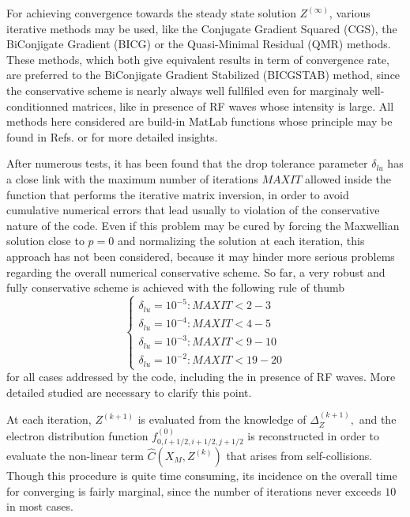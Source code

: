 For achieving convergence towards the steady state solution $Z^{(\infty )}$,
various iterative methods may be used, like the Conjugate Gradient Squared
(CGS), the BiConjigate Gradient (BICG) or the Quasi-Minimal Residual (QMR)
methods. These methods, which both give equivalent results in term of
convergence rate, are preferred to the BiConjigate Gradient Stabilized
(BICGSTAB) method, since the conservative scheme is nearly always well
fullfiled even for marginaly well-conditionned matrices, like in presence of
RF waves whose intensity is large. All methods here considered are build-in
MatLab functions whose principle may be found in Refs. \cite{pre92} or \cite
{axe94} for more detailed insights.

After numerous tests, it has been found that the drop tolerance parameter $%
\delta _{lu}$ has a close link with the maximum number of iterations $MAXIT$
allowed inside the function that performs the iterative matrix inversion, in
order to avoid cumulative numerical errors that lead usually to violation of
the conservative nature of the code. Even if this problem may be cured by
forcing the Maxwellian solution close to $p=0$ and normalizing the solution
at each iteration, this approach has not been considered, because it may
hinder more serious problems regarding the overall numerical conservative
scheme. So far, a very robust and fully conservative scheme is achieved with
the following rule of thumb
\begin{equation}
\left\{
\begin{array}{l}
\delta _{lu}=10^{-5}:MAXIT<2-3 \\
\delta _{lu}=10^{-4}:MAXIT<4-5 \\
\delta _{lu}=10^{-3}:MAXIT<9-10 \\
\delta _{lu}=10^{-2}:MAXIT<19-20
\end{array}
\right.
\end{equation}
for all cases addressed by the code, including the in presence of RF waves.
More detailed studied are necessary to clarify this point.

At each iteration, $Z^{(k+1)}$ is evaluated from the knowledge of $\Delta
_{Z}^{(k+1)},$ and the electron distribution function $%
f_{0,l+1/2,i+1/2,j+1/2}^{\left( 0\right) }$ is reconstructed in order to
evaluate the non-linear term $\widehat{C}\left( X_{M},Z^{(k)}\right) $ that
arises from self-collisions. Though this procedure is quite time consuming,
its incidence on the overall time for converging is fairly marginal, since
the number of iterations never exceeds $10$ in most cases.


